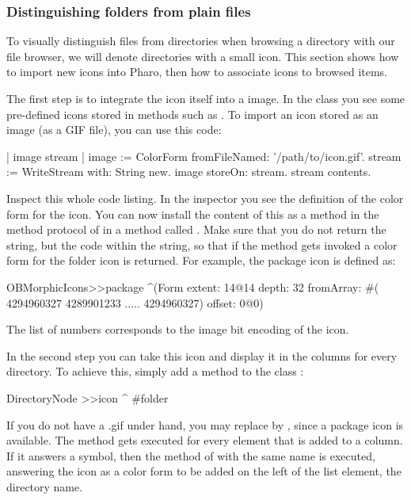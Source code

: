 \documentclass[a4paper,10pt,twoside]{book}
\begin{document}
\subsubsection{Distinguishing folders from plain files}

To visually distinguish files from directories when browsing a directory with our file browser, we will denote directories with a small icon. This section shows how to import new icons into Pharo, then how to associate icons to browsed items.

The first step is to integrate the icon itself into a \pharo image. In the class  you see some pre-defined icons stored in methods such as . To import an icon stored as an image (\eg as a GIF file), you can use this code:

\begin{code}{}
| image stream |
image := ColorForm fromFileNamed: '/path/to/icon.gif'.
stream := WriteStream with: String new.
image storeOn: stream.
stream contents.
\end{code}

Inspect this whole code listing. In the inspector you see the definition of the color form for the icon. You can now install the content of this  as a method in the method protocol  of  in a method called . Make sure that you do not return the string, but the code within the string, so that if the method gets invoked a color form for the folder icon is returned. For example, the package icon is defined as:

\begin{code}{}
OBMorphicIcons>>package
    ^(Form
	extent: 14@14
	depth: 32
	fromArray: #( 4294960327 4289901233 .....  4294960327)
	offset: 0@0)
\end{code}

The list of numbers corresponds to the image bit encoding of the icon.

In the second step you can take this icon and display it in the columns for every directory. To achieve this, simply add a method  to the class :

\begin{code}{}
DirectoryNode >>icon
	^ #folder  
\end{code}

If you do not have a .gif under hand, you may replace  by , since a package icon is available. The method  gets executed for every element that is added to a column. If it answers a symbol, then the method of  with the same name is executed, answering the icon as a color form to be added on the left of the list element, \ie the directory name.
\end{document}
